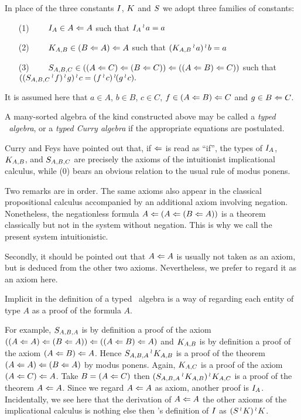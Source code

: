 In place of the three constants ${I}$, ${K}$ and ${S}$ we adopt three families of constants:
\begin{enumerate}[align=left]
\item[(1)]$\qquad {I}_{A} \in A \Leftarrow A$ such that ${I}_{A} \mathop{{}^\wr}\kern-.8pt a = a$
\item[(2)]$\qquad {K}_{A,B} \in (B \Leftarrow A) \Leftarrow A$ such that $({K}_{A,B}\mathop{{}^\wr}\kern-.8pt a)\mathop{{}^\wr}\kern-.8pt b = a$
\item[(3)]$\qquad {S}_{A,B,C} \in ((A \Leftarrow C) \Leftarrow (B \Leftarrow C)) \Leftarrow ((A \Leftarrow B) \Leftarrow C))$ such that
$(({S}_{A,B,C} \mathop{{}^\wr}\kern-.8pt f) \mathop{{}^\wr}\kern-.8pt g) \mathop{{}^\wr}\kern-.8pt c = (f \mathop{{}^\wr}\kern-.8pt c) \mathop{{}^\wr}\kern-.8pt (g \mathop{{}^\wr}\kern-.8pt c).$
\end{enumerate}
It is assumed here that $a\in A$, $b \in B$, $c\in C$, $f \in (A \Leftarrow B) \Leftarrow C$ and $g \in B \Leftarrow C$.

A many-sorted algebra of the kind constructed above
may be called a {\it typed \schon\ algebra}, or a {\it typed Curry algebra} if the appropriate
equations are postulated.

Curry and Feys have pointed out that, if $\Leftarrow$ is read as ``if'',
the types of ${I}_{A}$, ${K}_{A,B}$, and ${S}_{A,B,C}$ are precisely the axioms of the
intuitionist implicational calculus, while (0) bears an obvious relation to
the usual rule of modus ponens.

Two remarks are in order. The same axioms also appear in the classical
propositional calculus accompanied by an additional axiom involving negation.
Nonetheless, the negationless formula $A \Leftarrow (A \Leftarrow (B \Leftarrow A))$ is a
theorem classically but not in the system without negation.
This is why we call the present system intuitionistic.

Secondly, it should be pointed out that $A \Leftarrow A$ is usually not
taken as an axiom, but is deduced from the other two axioms. Nevertheless,
we prefer to regard it as an axiom here.

Implicit in the definition of a typed \schon\ algebra
is a way of regarding each entity of type $A$ as a proof of the
formula $A$.

For example, ${S}_{A,B,A}$ is by definition a proof of the axiom
$((A \Leftarrow A)\Leftarrow(B\Leftarrow A))\Leftarrow((A\Leftarrow B)\Leftarrow A)$
and ${K}_{A,B}$ is by definition a proof of the axiom $(A \Leftarrow B) \Leftarrow A$.
Hence ${S}_{A,B,A} \mathop{{}^\wr}\kern-.8pt {K}_{A,B}$ is a proof of the theorem $(A\Leftarrow A) \Leftarrow (B\Leftarrow A)$
by modus ponens. Again, ${K}_{A,C}$ is a proof of the axiom
$(A \Leftarrow C) \Leftarrow A$. Take $B = (A \Leftarrow C)$
then $({S}_{A,B,A}\mathop{{}^\wr}\kern-.8pt {K}_{A,B})\mathop{{}^\wr}\kern-.8pt {K}_{A,C}$ is a proof of the theorem $A \Leftarrow A$.
Since we regard $A\Leftarrow A$ as axiom, another proof is ${I}_{A}$. Incidentally,
we see here that the derivation of $A \Leftarrow A$ the other axioms of the
implicational calculus is nothing else then \schon's
definition of ${I}$ as $({S} \mathop{{}^\wr}\kern-.8pt {K})\mathop{{}^\wr}\kern-.8pt {K}$.

